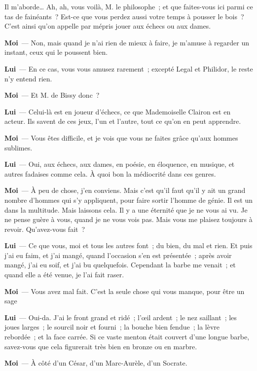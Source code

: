 \documentclass[french,twoside]{book} %
\newcommand{\labelchar}[1]{\textbf{\color{rubric} #1}}
\begin{document}
Il m’aborde… Ah, ah, vous voilà, M. le philosophe ; et que faites-vous ici parmi ce tas de fainéants ? Est-ce que vous perdez aussi votre temps à pousser le bois ? C’est ainsi qu’on appelle par mépris jouer aux échecs ou aux dames.\par
\labelchar{Moi} — Non, mais quand je n’ai rien de mieux à faire, je m’amuse à regarder un instant, ceux qui le poussent bien.\par
\labelchar{Lui} — En ce cas, vous vous amusez rarement ; excepté Legal et Philidor, le reste n’y entend rien.\par
\labelchar{Moi} — Et M. de Bissy donc ?\par
\labelchar{Lui} — Celui-là est en joueur d’échecs, ce que Mademoiselle Clairon est en acteur. Ils savent de ces jeux, l’un et l’autre, tout ce qu’on en peut apprendre.\par
\labelchar{Moi} — Vous êtes difficile, et je vois que vous ne faites grâce qu’aux hommes sublimes.\par
\labelchar{Lui} — Oui, aux échecs, aux dames, en poésie, en éloquence, en musique, et autres fadaises comme cela. À quoi bon la médiocrité dans ces genres.\par
\labelchar{Moi} — À peu de chose, j’en conviens. Mais c’est qu’il faut qu’il y ait un grand nombre d’hommes qui s’y appliquent, pour faire sortir l’homme de génie. Il est un dans la multitude. Mais laissons cela. Il y a une éternité que je ne vous ai vu. Je ne pense guère à vous, quand je ne vous vois pas. Mais vous me plaisez toujours à revoir. Qu’avez-vous fait ?\par
\labelchar{Lui} — Ce que vous, moi et tous les autres font ; du bien, du mal et rien. Et puis j’ai eu faim, et j’ai mangé, quand l’occasion s’en est présentée ; après avoir mangé, j’ai eu soif, et j’ai bu quelquefois. Cependant la barbe me venait ; et quand elle a été venue, je l’ai fait raser.\par
\labelchar{Moi} — Vous avez mal fait. C’est la seule chose qui vous manque, pour être un sage\par
\labelchar{Lui} — Oui-da. J’ai le front grand et ridé ; l’œil ardent ; le nez saillant ; les joues larges ; le sourcil noir et fourni ; la bouche bien fendue ; la lèvre rebordée ; et la face carrée. Si ce vaste menton était couvert d’une longue barbe, savez-vous que cela figurerait très bien en bronze ou en marbre.\par
\labelchar{Moi} — À côté d’un César, d’un Marc-Aurèle, d’un Socrate.\par
\end{document}
